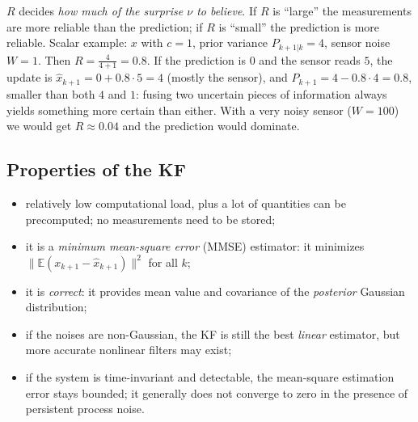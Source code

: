 \documentclass[11pt,a4paper]{article}
\def\boldsymbol#1{#1}%
\def\mathbf#1{#1}%
\newcommand{\E}{\mathbb{E}}
\newcommand{\hx}{\hat{\boldsymbol{x}}}
\newcommand{\bx}{\boldsymbol{x}}
\newcommand{\bnu}{\boldsymbol{\nu}}
\newcommand{\mR}{\mathbf{R}}
\theoremstyle{definition}
\theoremstyle{plain}
\theoremstyle{remark}
\begin{document}
\begin{intuition}
$\mR$ decides \emph{how much of the surprise $\bnu$ to believe}. If $\mR$ is ``large'' the measurements are more reliable than
the prediction; if $\mR$ is ``small'' the prediction is more reliable. Scalar example: $x$ with $c=1$, prior variance
$P_{k+1|k}=4$, sensor noise $W=1$. Then $R=\tfrac{4}{4+1}=0.8$. If the prediction is $0$ and the sensor reads $5$, the update is
$\hat x_{k+1}=0+0.8\cdot5=4$ (mostly the sensor), and $P_{k+1}=4-0.8\cdot4=0.8$, smaller than both $4$ and $1$: fusing two
uncertain pieces of information always yields something more certain than either. With a very noisy sensor ($W=100$) we would get
$R\approx0.04$ and the prediction would dominate.
\end{intuition}

\subsection{Properties of the KF}

\begin{itemize}
\item relatively low computational load, plus a lot of quantities can be precomputed; no measurements need to be stored;
\item it is a \emph{minimum mean-square error} (MMSE) estimator: it minimizes $\|\E(\bx_{k+1}-\hx_{k+1})\|^2$ for all $k$;
\item it is \emph{correct}: it provides mean value and covariance of the \emph{posterior} Gaussian distribution;
\item if the noises are non-Gaussian, the KF is still the best \emph{linear} estimator, but more accurate nonlinear filters may exist;
\item if the system is time-invariant and detectable, the mean-square estimation error stays bounded; it generally does not converge
to zero in the presence of persistent process noise.
\end{itemize}
\end{document}
